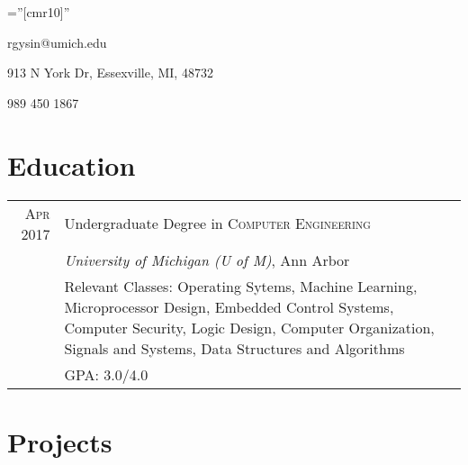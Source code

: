 \documentclass[a4paper,10pt]{article} %
\newcommand\rightleftbox[1]{ \parbox{.30\textwidth}{#1} }
\newcommand\centerbox[1]{ \parbox{.40\textwidth}{#1} }
\begin{document}
\pagestyle{empty} %

\font\fb=''[cmr10]'' %


\par{\bigskip\par} %

\par{
\rightleftbox{rgysin@umich.edu\hfill}
\centerbox{913 N York Dr, Essexville, MI, 48732}
\rightleftbox{\hfill989 450 1867}
}


\section{Education}

\begin{tabular}{r|p{12cm}}
\textsc{Apr} 2017 \space\space & Undergraduate Degree in \textsc{Computer Engineering} \\
& \normalsize\emph{University of Michigan (U of M)}, Ann Arbor \\
& \footnotesize{Relevant Classes: Operating Sytems, Machine Learning,
  Microprocessor Design, Embedded Control Systems, Computer Security,
  Logic Design, Computer Organization, Signals and Systems,
  Data Structures and Algorithms}\\
& \footnotesize{GPA: 3.0/4.0} \\
\end{tabular}


\section{Projects}
\end{document}
